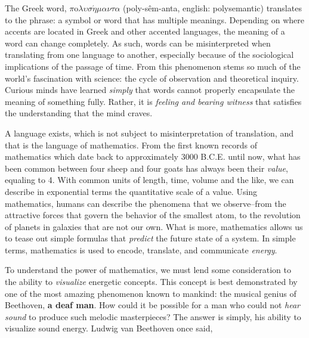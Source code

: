 \documentclass[12pt]{ucsddissertation}
\begin{document}
\mainmatter



\begin{dissertationintroduction}

The Greek word, $\pi$o$\lambda\upsilon\sigma\acute{\eta}\mu\alpha\nu\tau\alpha$ (poly-s\^em-anta, english: polysemantic) translates to the phrase: a symbol or word that has multiple meanings. Depending on where accents are located in Greek and other accented languages, the meaning of a word can change completely. As such, words can be misinterpreted when translating from one language to another, especially because of the sociological implications of the passage of time. From this phenomenon stems so much of the world's fascination with science: the cycle of observation and theoretical inquiry. Curious minds have learned \textit{simply} that words cannot properly encapsulate the meaning of something fully. Rather, it is \textit{feeling and bearing witness} that satisfies the understanding that the mind craves. 

A language exists, which is not subject to misinterpretation of translation, and that is the language of mathematics. From the first known records of mathematics which date back to approximately 3000 B.C.E. until now, what has been common between four sheep and four goats has always been their \textit{value}, equaling to 4. With common units of length, time, volume and the like, we can describe in exponential terms the quantitative scale of a value. Using mathematics, humans can describe the phenomena that we observe--from the attractive forces that govern the behavior of the smallest atom, to the revolution of planets in galaxies that are not our own.  What is more, mathematics allows us to tease out simple formulas that \textit{predict} the future state of a system. In simple terms, mathematics is used to encode, translate, and communicate \textit{energy}.

To understand the power of mathematics, we must lend some consideration to the ability to \textit{visualize} energetic concepts. This concept is best demonstrated by one of the most amazing phenomenon known to mankind: the musical genius of Beethoven, \textbf{a deaf man}. How could it be possible for a man who could not \textit{\textit{hear sound}} to produce such melodic masterpieces? The answer is simply, his ability to visualize sound energy. Ludwig van Beethoven once said, 


\end{dissertationintroduction}
\end{document}
